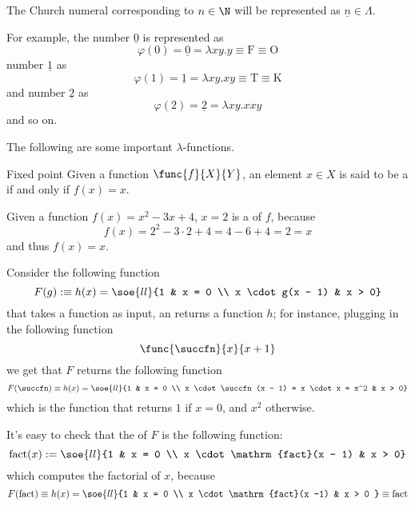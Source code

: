 \documentclass[a4paper, 12pt]{report}
\begin{document}
    The Church numeral corresponding to $n \in \N$ will be represented as $\underline n \in \Lambda$.

    \begin{example}
        For example, the number $\underline 0$ is represented as $$\varphi(0) = \underline 0 = \lambda xy. y \equiv \mathrm F \equiv \mathrm O$$ number $\underline 1$ as $$\varphi(1) = \underline 1 = \lambda xy.xy \equiv \mathrm T \equiv \mathrm K$$ and number $\underline 2$ as $$\varphi(2) = \underline 2 = \lambda xy.xxy$$ and so on.
    \end{example}

    The following are some important $\lambda$-functions. 

    \begin{frameddefn}{Fixed point}
        Given a function $\func{f}{X}{Y}$, an element $x \in X$ is said to be a  if and only if $f(x) = x$.
    \end{frameddefn}

    \begin{example}
        Given a function $f(x) = x^2 - 3x + 4$, $x = 2$ is a  of $f$, because $$f(x) = 2^2 - 3 \cdot 2 + 4 = 4 - 6 + 4 = 2 = x$$ and thus $f(x) = x$.
    \end{example}

    \begin{example}
        Consider the following function $$F(g) :\equiv h(x) = \soe{ll}{1 & x = 0 \\ x \cdot g(x - 1) & x > 0}$$ that takes a function as input, an returns a function $h$; for instance, plugging in the following function $$\func{\succfn}{x}{x + 1}$$ we get that $F$ returns the following function $$F(\succfn) \equiv h(x) = \soe{ll}{1 & x = 0 \\ x \cdot \succfn(x - 1) = x \cdot x = x^2 & x > 0}$$ which is the function that returns $1$ if $x = 0$, and $x^2$ otherwise.

        It's easy to check that the  of $F$ is the following function: $$\mathrm{fact}(x) := \soe{ll}{1 & x = 0 \\ x \cdot \mathrm{fact}(x - 1) & x > 0}$$ which computes the factorial of $x$, because $$F(\mathrm{fact}) \equiv h(x) = \soe{ll}{1 & x = 0 \\ x \cdot \mathrm{fact}(x -1) & x > 0 } \equiv \mathrm{fact}$$
    \end{example}
\end{document}
